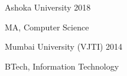 \documentclass[10pt]{article}
\renewcommand{\section}[2]%
        {\pagebreak[3]\vspace{1.3\baselineskip}%
         \phantomsection\addcontentsline{toc}{section}{#1}%
         \hspace{0in}%
         \marginpar{
         \raggedright \scshape #1}#2}
\newcommand{\halfblankline}{\quad\vspace{-0.5\baselineskip}\pagebreak[3]}
\begin{document}

\halfblankline

Ashoka University \hfill 2018

\quad MA, Computer Science 



\halfblankline

Mumbai University (VJTI) \hfill 2014

\quad BTech, Information Technology 





\end{document}
